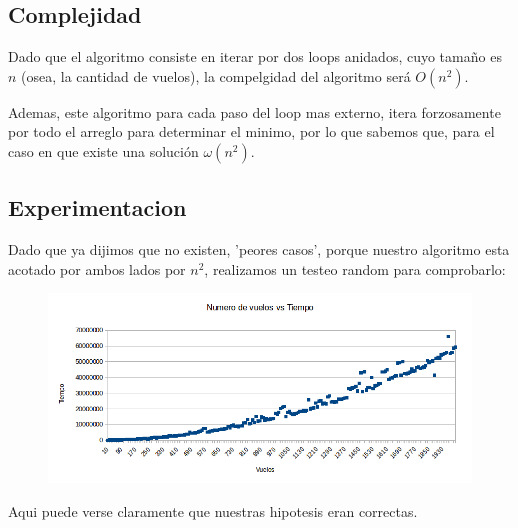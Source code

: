 \subsection{Complejidad}

Dado que el algoritmo consiste en iterar por dos loops anidados, cuyo tamaño es $n$ (osea, la cantidad de vuelos), la compelgidad del algoritmo será $O(n^2)$.

Ademas, este algoritmo para cada paso del loop mas externo, itera forzosamente por todo el arreglo para determinar el minimo, por lo que sabemos que, para el caso en que existe una solución $\omega (n^2)$.

\subsection{Experimentacion}

Dado que ya dijimos que no existen, 'peores casos', porque nuestro algoritmo esta acotado por ambos lados por $n^2$, realizamos un testeo random para comprobarlo:

\begin{figure}[h!]
  \begin{center}
	\includegraphics[scale=0.5]{Ej1/testingnvst.png}
	\label{nombreparareferenciar}
  \end{center}
\end{figure}

Aqui puede verse claramente que nuestras hipotesis eran correctas.